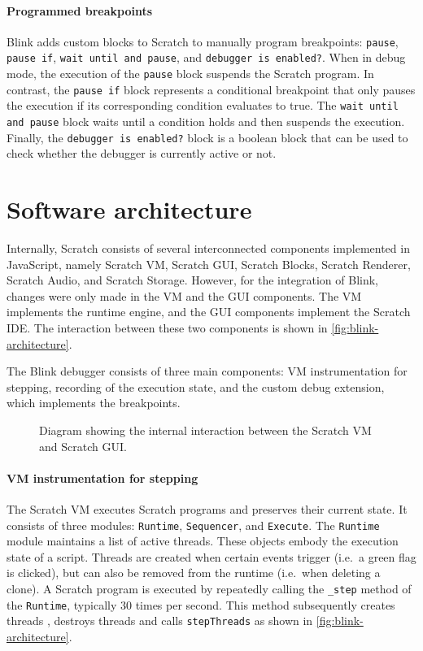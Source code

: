 \documentclass[../main]{subfiles}
\begin{document}
\paragraph{Programmed breakpoints}
Blink adds custom blocks to Scratch to manually program breakpoints: \texttt{pause}, \texttt{pause if}, \texttt{wait until and pause}, and \texttt{debugger is enabled?}.
When in debug mode, the execution of the \texttt{pause} block suspends the Scratch program.
In contrast, the \texttt{pause if} block represents a conditional breakpoint that only pauses the execution if its corresponding condition evaluates to true.
The \texttt{wait until and pause} block waits until a condition holds and then suspends the execution.
Finally, the \texttt{debugger is enabled?} block is a boolean block that can be used to check whether the debugger is currently active or not.

\section{Software architecture}\label{sec:blink-software-architecture}

Internally, Scratch consists of several interconnected components implemented in JavaScript, namely Scratch VM, Scratch GUI, Scratch Blocks, Scratch Renderer, Scratch Audio, and Scratch Storage.
However, for the integration of Blink, changes were only made in the VM and the GUI components.
The VM implements the runtime engine, and the GUI components implement the Scratch IDE\@.
The interaction between these two components is shown in \vref{fig:blink-architecture}.

The Blink debugger consists of three main components: VM instrumentation for stepping, recording of the execution state, and the custom debug extension, which implements the breakpoints.

\begin{figure}
    
    \caption{
        Diagram showing the internal interaction between the Scratch VM and Scratch GUI\@.
    }
    \label{fig:blink-architecture}
\end{figure}

\paragraph{VM instrumentation for stepping}

The Scratch VM executes Scratch programs and preserves their current state.
It consists of three modules: \texttt{Runtime}, \texttt{Sequencer}, and \texttt{Execute}.
The \texttt{Runtime} module maintains a list of active threads.
These objects embody the execution state of a script.
Threads are created when certain events trigger (i.e.\ a green flag is clicked), but can also be removed from the runtime (i.e.\ when deleting a clone).
A Scratch program is executed by repeatedly calling the \texttt{\_step} method of the \texttt{Runtime}, typically 30 times per second.
This method subsequently creates threads , destroys threads  and calls \texttt{stepThreads}  as shown in \vref{fig:blink-architecture}.
\end{document}
